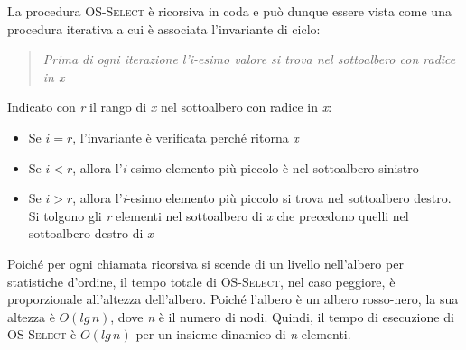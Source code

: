 \documentclass[10pt, a4paper]{report}
\begin{document}
La procedura \textsc{OS-Select} è ricorsiva in coda e può dunque essere vista come una procedura iterativa a cui è associata l'invariante di ciclo:
\begin{quote}
\textit{Prima di ogni iterazione l'i-esimo valore si trova nel sottoalbero con radice in x}
\end{quote}
Indicato con \textit{r} il rango di \textit{x} nel sottoalbero con radice in \textit{x}:
\begin{itemize}
\item Se $i = r$, l'invariante è verificata perché ritorna \textit{x}
\item Se $i < r$, allora l'\textit{i}-esimo elemento più piccolo è nel sottoalbero sinistro
\item Se $i > r$, allora l'\textit{i}-esimo elemento più piccolo si trova nel sottoalbero destro. Si tolgono gli \textit{r} elementi nel sottoalbero di \textit{x} che precedono quelli nel sottoalbero destro di \textit{x}
\end{itemize}
Poiché per ogni chiamata ricorsiva si scende di un livello nell'albero per statistiche d'ordine, il tempo totale di \textsc{OS-Select}, nel caso peggiore, è proporzionale all'altezza dell'albero. Poiché l'albero è un albero rosso-nero, la sua altezza è $O(lg\,n)$, dove \textit{n} è il numero di nodi. Quindi, il tempo di esecuzione di \textsc{OS-Select} è $O(lg\,n)$ per un insieme dinamico di \textit{n} elementi.
\end{document}
